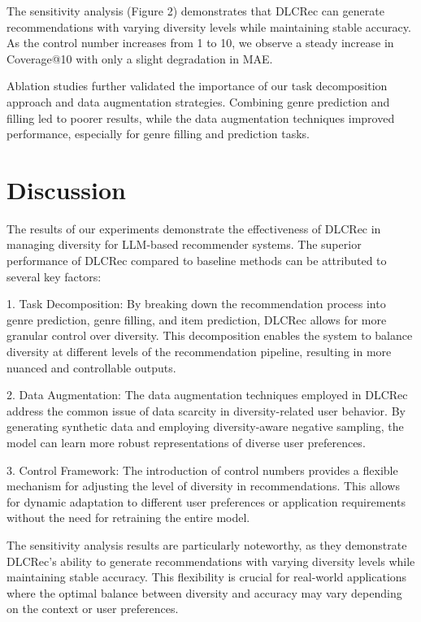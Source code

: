 \documentclass[12pt,letterpaper]{article}
\begin{document}
The sensitivity analysis (Figure 2) demonstrates that DLCRec can generate recommendations with varying diversity levels while maintaining stable accuracy. As the control number increases from 1 to 10, we observe a steady increase in Coverage@10 with only a slight degradation in MAE.

Ablation studies further validated the importance of our task decomposition approach and data augmentation strategies. Combining genre prediction and filling led to poorer results, while the data augmentation techniques improved performance, especially for genre filling and prediction tasks.

\section{Discussion}

The results of our experiments demonstrate the effectiveness of DLCRec in managing diversity for LLM-based recommender systems. The superior performance of DLCRec compared to baseline methods can be attributed to several key factors:

1. Task Decomposition: By breaking down the recommendation process into genre prediction, genre filling, and item prediction, DLCRec allows for more granular control over diversity. This decomposition enables the system to balance diversity at different levels of the recommendation pipeline, resulting in more nuanced and controllable outputs.

2. Data Augmentation: The data augmentation techniques employed in DLCRec address the common issue of data scarcity in diversity-related user behavior. By generating synthetic data and employing diversity-aware negative sampling, the model can learn more robust representations of diverse user preferences.

3. Control Framework: The introduction of control numbers provides a flexible mechanism for adjusting the level of diversity in recommendations. This allows for dynamic adaptation to different user preferences or application requirements without the need for retraining the entire model.

The sensitivity analysis results are particularly noteworthy, as they demonstrate DLCRec's ability to generate recommendations with varying diversity levels while maintaining stable accuracy. This flexibility is crucial for real-world applications where the optimal balance between diversity and accuracy may vary depending on the context or user preferences.
\end{document}

